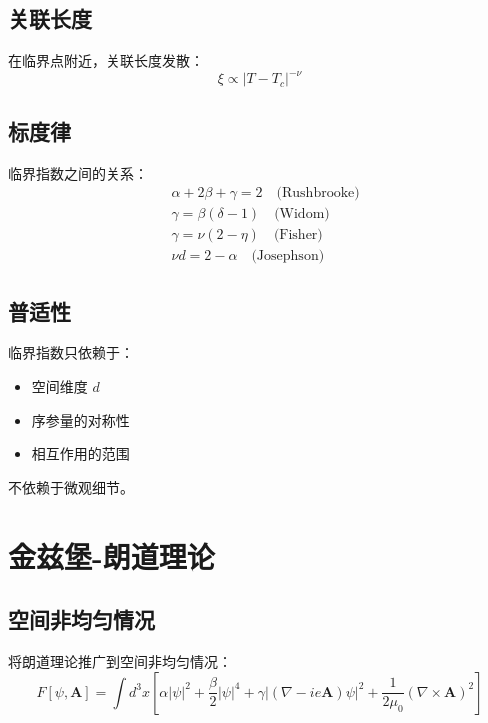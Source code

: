 \documentclass[12pt,a4paper]{ctexart}
\begin{document}
\subsection{关联长度}

在临界点附近，关联长度发散：
\begin{equation}
    \xi \propto |T - T_c|^{-\nu}
\end{equation}

\subsection{标度律}

临界指数之间的关系：
\begin{align}
    &\alpha + 2\beta + \gamma = 2 \quad \text{(Rushbrooke)} \\
    &\gamma = \beta(\delta - 1) \quad \text{(Widom)} \\
    &\gamma = \nu(2 - \eta) \quad \text{(Fisher)} \\
    &\nu d = 2 - \alpha \quad \text{(Josephson)}
\end{align}

\subsection{普适性}

临界指数只依赖于：
\begin{itemize}
    \item 空间维度 $d$
    \item 序参量的对称性
    \item 相互作用的范围
\end{itemize}

不依赖于微观细节。

\section{金兹堡-朗道理论}

\subsection{空间非均匀情况}

将朗道理论推广到空间非均匀情况：
\begin{equation}
    F[\psi, \mathbf{A}] = \int d^3x \left[ \alpha|\psi|^2 + \frac{\beta}{2}|\psi|^4
    + \gamma|(\nabla - ie\mathbf{A})\psi|^2 + \frac{1}{2\mu_0}(\nabla \times \mathbf{A})^2 \right]
\end{equation}
\end{document}
